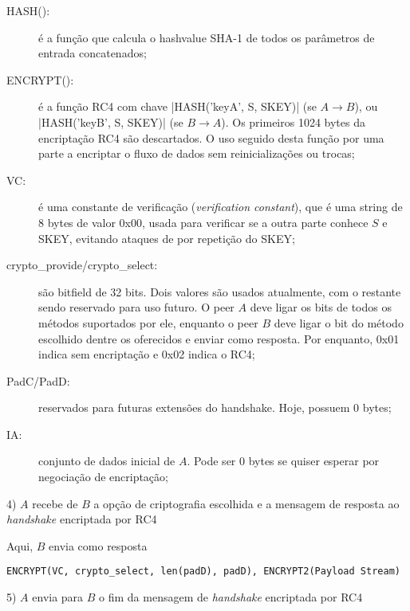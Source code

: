 \begin{description}
    \item[HASH():] é a função que calcula o \gls*{hashvalue} SHA-1 de todos os
        parâmetros de entrada concatenados;

    \item[ENCRYPT():] é a função RC4 com chave \bverb|HASH('keyA', S, SKEY)| (se
        $A \rightarrow B$), ou \bverb|HASH('keyB', S, SKEY)| (se $B \rightarrow A$). Os
        primeiros 1024 bytes da encriptação RC4 são descartados. O uso seguido desta
        função por uma parte a encriptar o fluxo de dados sem reinicializações ou
        trocas;

    \item[VC:] é uma constante de verificação (\emph{verification constant}), que é uma
        string de 8 bytes de valor 0x00, usada para verificar se a outra parte conhece
        $S$ e SKEY, evitando ataques de por repetição do SKEY;

    \item[crypto\_provide/crypto\_select:] são bitfield de 32 bits. Dois valores são
        usados atualmente, com o restante sendo reservado para uso futuro. O \gls*{peer}
        $A$ deve ligar os bits de todos os métodos suportados por ele, enquanto o
        \gls*{peer} $B$ deve ligar o bit do método escolhido dentre os oferecidos e
        enviar como resposta. Por enquanto, 0x01 indica sem encriptação e 0x02 indica o
        RC4;

    \item[PadC/PadD:] reservados para futuras extensões do handshake. Hoje, possuem 0
         bytes;

    \item[IA:] conjunto de dados inicial de $A$. Pode ser 0 bytes se quiser esperar por
        negociação de encriptação;
\end{description}


4) $A$ recebe de $B$ a opção de criptografia escolhida e a mensagem de resposta ao
\emph{handshake} encriptada por RC4

Aqui, $B$ envia como resposta

\begin{verbatim}
ENCRYPT(VC, crypto_select, len(padD), padD), ENCRYPT2(Payload Stream)
\end{verbatim}


5) $A$ envia para $B$ o fim da mensagem de \emph{handshake} encriptada por RC4

